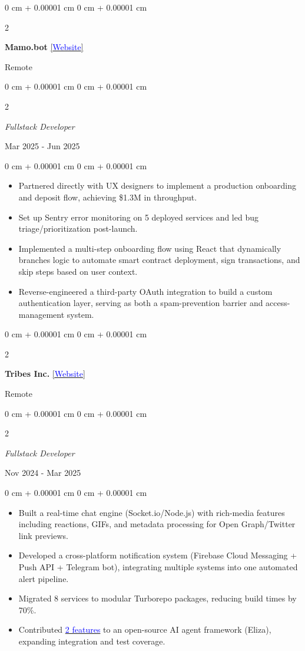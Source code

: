 \documentclass[10pt, letterpaper]{article}
\newenvironment{highlights}{
		\begin{itemize}[
        topsep=0.10 cm,
        parsep=0.10 cm,
        partopsep=0pt,
        itemsep=0pt,
        leftmargin=0 cm + 10pt
						]
				}{
		\end{itemize}
} %
\newenvironment{onecolentry}{
		\begin{adjustwidth}{
						0 cm + 0.00001 cm
    }{
						0 cm + 0.00001 cm
    }
		}{
		\end{adjustwidth}
} %
\newenvironment{twocolentry}[2][]{
		\onecolentry
		\def\secondColumn{#2}
		\setcolumnwidth{\fill, 4.5 cm}
		\begin{paracol}{2}
		}{
    \switchcolumn \raggedleft \secondColumn
		\end{paracol}
		\endonecolentry
} %
\let\hrefWithoutArrow\href
\begin{document}
\begin{twocolentry}{Remote}
		\textbf{Mamo.bot}
		\hrefWithoutArrow{https://mamo.bot}{[\textcolor{blue}{Website}]}
\end{twocolentry}
\begin{twocolentry}{Mar 2025 - Jun 2025}
		\textit{Fullstack Developer}
\end{twocolentry}
\vspace{0.10 cm}
\begin{onecolentry}
		\begin{highlights}
		\item Partnered directly with UX designers to implement a production onboarding and deposit flow,
				achieving \$1.3M in throughput.
		\item Set up Sentry error monitoring on 5 deployed services and led bug
				triage/prioritization post-launch.
		\item Implemented a multi-step onboarding flow using React that dynamically branches
				logic to automate smart contract deployment, sign transactions, and skip steps based
				on user context.
		\item Reverse-engineered a third-party OAuth integration to build a custom authentication layer,
				serving as both a spam-prevention barrier and access-management system.
		\end{highlights}
\end{onecolentry}

\vspace{0.15 cm}

\begin{twocolentry}{Remote}
		\textbf{Tribes Inc.}
		\hrefWithoutArrow{https://tribes.xyz/}{[\textcolor{blue}{Website}]}
\end{twocolentry}
\begin{twocolentry}{Nov 2024 - Mar 2025}
		\textit{Fullstack Developer}
\end{twocolentry}
\vspace{0.10 cm}
\begin{onecolentry}
		\begin{highlights}
		\item Built a real-time chat engine (Socket.io/Node.js) with
				rich-media features including reactions, GIFs, and metadata processing for Open
				Graph/Twitter link previews.
		\item Developed a cross-platform notification system (Firebase Cloud Messaging + Push
				API + Telegram bot), integrating multiple systems into one automated alert pipeline.
		\item Migrated 8 services to modular Turborepo packages, reducing build times by 70\%.
		\item Contributed
				\hrefWithoutArrow{https://github.com/elizaOS/eliza/commits?author=ncale}{\textcolor{blue}{2
				features}} to an open-source AI agent framework (Eliza), expanding integration and
				test coverage.
		\end{highlights}
\end{onecolentry}
\end{document}
